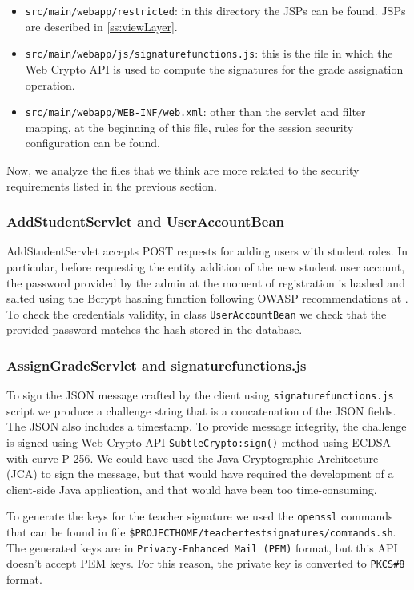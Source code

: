 \begin{itemize}
    \item \texttt{src/main/webapp/restricted}: in this directory the JSPs can be found. JSPs are described in \autoref{ss:viewLayer}.
    \item \texttt{src/main/webapp/js/signature\textunderscore functions.js}: this is the file in which the Web Crypto API is used to compute the signatures for the grade assignation operation.
    \item \texttt{src/main/webapp/WEB-INF/web.xml}: other than the servlet and filter mapping, at the beginning of this file, rules for the session security configuration can be found.
\end{itemize}

Now, we analyze the files that we think are more related to the security requirements listed in the previous section.

\subsubsection{AddStudentServlet and UserAccountBean}
\label{ss:AddStuServ}

AddStudentServlet accepts POST requests for adding users with student roles. In particular, before requesting the entity addition of the new student user account, the password provided by the admin at the moment of registration is hashed and salted using the Bcrypt hashing function following OWASP recommendations at \cite{online:OWASPpass}. To check the credentials validity, in class \texttt{UserAccountBean} we check that the provided password matches the hash stored in the database.

\subsubsection{AssignGradeServlet and signature\textunderscore functions.js}
\label{ss:SignFunct}

To sign the JSON message crafted by the client using \texttt{signature\textunderscore functions.js} script we produce a challenge string that is a concatenation of the JSON fields. The JSON also includes a timestamp. To provide message integrity, the challenge is signed using Web Crypto API \texttt{SubtleCrypto:sign()} method using ECDSA with curve P-256. We could have used the Java Cryptographic Architecture (JCA) to sign the message, but that would have required the development of a client-side Java application, and that would have been too time-consuming. 

To generate the keys for the teacher signature we used the \texttt{openssl} commands that can be found in file \texttt{\${PROJECT\textunderscore HOME}/teacher\textunderscore test\textunderscore signatures/commands.sh}. The generated keys are in \texttt{Privacy-Enhanced Mail (PEM)} format, but this API doesn't accept PEM keys. For this reason, the private key is converted to \texttt{PKCS\#8} format.

